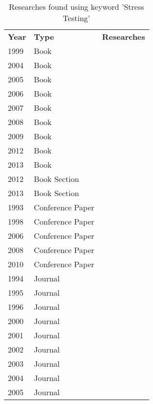 \begin{table}[]
\centering
\caption{Researches found using keyword 'Stress Testing'}
\label{my-label}
\begin{tabular}{lll}
\rowcolor[HTML]{C0C0C0} 
\textbf{Year} & \textbf{Type} & \textbf{Researches} \\
1999 & Book & \cite{Dustin1999} \\
2004 & Book & \cite{Perry2004} \\
2005 & Book & \cite{Lewis2005} \\
2006 & Book & \cite{Havelund2006} \\
2007 & Book & \cite{Corporation2007} \\
2008 & Book & \cite{Halili2008} \\
2009 & Book & \cite{Molyneaux2009} \\
2012 & Book & \cite{Kaczanowski2012} \\
2013 & Book & \cite{Erinle2013}\cite{Talbi2013} \\
2012 & Book Section & \cite{Avritzer2012a} \\
2013 & Book Section & \cite{Mayo2013} \\
1993 & Conference Paper & \cite{Avritzer1993d} \\
1998 & Conference Paper & \cite{Alander} \\
2006 & Conference Paper & \cite{Draheim2006b}\cite{Abu-nimeh2001} \\
2008 & Conference Paper & \cite{Jiang2008b} \\
2010 & Conference Paper & \cite{Yu2010a} \\
1994 & Journal & \cite{Avritzer1994} \\
1995 & Journal & \cite{Avritzer1995} \\
1996 & Journal & \cite{Yang1996} \\
2000 & Journal & \cite{Weyuker2000} \\
2001 & Journal & \cite{El-far2001} \\
2002 & Journal & \cite{Menasce2002a} \\
2003 & Journal & \cite{Brown2003} \\
2004 & Journal & \cite{Dumitrescu2004}\cite{Barber2004}\cite{Sandler2004}\cite{McMinn2004} \\
2005 & Journal & \cite{Briand2005} \\

\end{tabular}
\end{table}
